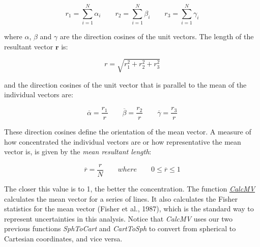 \documentclass[a4paper , 12pt]{book}
\begin{document}
\begin{equation}
    r_1=\sum_{i=1}^{N}\alpha_i\qquad r_2=\sum_{i=1}^{N}\beta_i\qquad r_3=\sum_{i=1}^{N}\gamma_i \tag{4.15a}
\end{equation}

where $\alpha$, $\beta$ and $\gamma$ are the direction cosines of the unit vectors. The length of the resultant vector $\mathbf{r}$ is:

\begin{equation}
    r=\sqrt{r_1^2+r_2^2+r_3^2} \tag{4.15b}
\end{equation}

and the direction cosines of the unit vector that is parallel to the mean of the individual vectors are:

\begin{equation}
    \overline{\alpha}=\frac{r_1}{r}\qquad \overline{\beta}=\frac{r_2}{r}\qquad \overline{\gamma}=\frac{r_3}{r} \tag{4.15c}
\end{equation}

These direction cosines define the orientation of the mean vector. A measure of how concentrated the individual vectors are or how representative the mean vector is, is given by the \textit{mean resultant length}:

\begin{equation}
    \overline{r}=\frac{r}{N}\qquad where\qquad 0\leq\overline{r}\leq 1 \tag{4.15d}
\end{equation}

The closer this value is to 1, the better the concentration. The function \href{https://github.com/nfcd/compGeo/blob/master/source/functions/CalcMV.py}{\textit{CalcMV}} calculates the mean vector for a series of lines. It also calculates the Fisher statistics for the mean vector (Fisher et al., 1987), which is the standard way to represent uncertainties in this analysis. Notice that \textit{CalcMV} uses our two previous functions \textit{SphToCart} and \textit{CartToSph} to convert from spherical to Cartesian coordinates, and vice versa.
\end{document}

